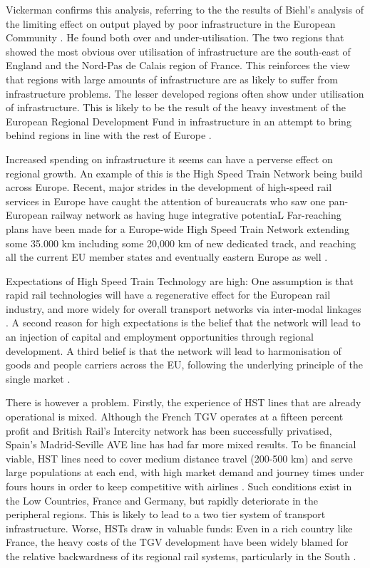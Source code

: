 Vickerman confirms this analysis, referring to the the results of Biehl's analysis of the limiting effect on output played by poor infrastructure in the European Community \citep{Biehl:1991}. He found both over and under-utilisation. The two regions that showed the most obvious over utilisation of infrastructure are the south-east of England and the Nord-Pas de Calais region of France. This reinforces the view that regions with large amounts of infrastructure are as likely to suffer from infrastructure problems. The lesser developed regions often show under utilisation of infrastructure. This is likely to be the result of the heavy investment of the European Regional Development Fund in infrastructure in an attempt to bring behind regions in line with the rest of Europe \citep{Vickerman:1994}.

Increased spending on infrastructure it seems can have a perverse effect on regional growth. An example of this is the High Speed Train Network being build across Europe. Recent, major strides in the development of high-speed rail services in Europe have caught the attention of bureaucrats who saw one pan-European railway network as having huge integrative potentiaL Far-reaching plans have been made for a Europe-wide High Speed Train Network extending some 35.000 km including some 20,000 km of new dedicated track, and reaching all the current EU member states and eventually eastern Europe as well \citep{Ross:1994}.

Expectations of High Speed Train Technology are high: One assumption is that rapid rail technologies will have a regenerative effect for the European rail industry, and more widely for overall transport networks via inter-modal linkages \citep{EC:1990}. A second reason for high expectations is the belief that the network will lead to an injection of capital and employment opportunities through regional development. A third belief is that the network will lead to harmonisation of goods and people carriers across the EU, following the underlying principle of the single market \citep{Ross:1994}.

There is however a problem. Firstly, the experience of HST lines that are already operational is mixed. Although the French TGV operates at a fifteen percent profit and British Rail's Intercity network has been successfully privatised, Spain's Madrid-Seville AVE line has had far more mixed results. To be financial viable, HST lines need to cover medium distance travel (200-500 km) and serve large populations at each end, with high market demand and journey times under fours hours in order to keep competitive with airlines \citep{Blum:1992}. Such conditions exist in the Low Countries, France and Germany, but rapidly deteriorate in the peripheral regions. This is likely to lead to a two tier system of transport infrastructure. Worse, HSTs draw in valuable funds: Even in a rich country like France, the heavy costs of the TGV development have been widely blamed for the relative backwardness of its regional rail systems, particularly in the South \citep{Vickerman:1990}.

